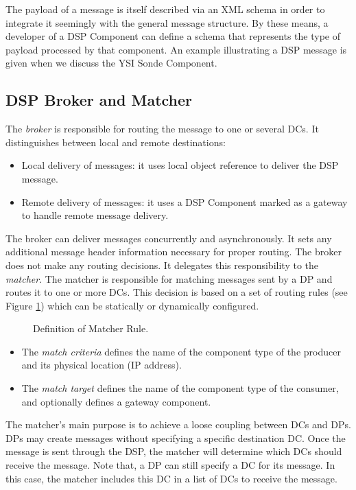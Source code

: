 \documentclass[conference]{IEEEtran}
\begin{document}
The payload of a message is itself described via an XML schema in
order to integrate it seemingly with the general message structure. By these
means, a developer of a DSP Component can define a schema that represents the
type of payload processed by that component. An example illustrating a DSP
message is given when we discuss the YSI Sonde Component.

\subsection{DSP Broker and Matcher}

The \emph{broker} is responsible for routing the message to one or
several DCs. It distinguishes between local and remote destinations:

\begin{itemize}
\item Local delivery of messages: it uses local object reference to
  deliver the DSP message.
\item Remote delivery of messages: it uses a DSP Component marked as a
  gateway to handle remote message delivery.
\end{itemize}

The broker can deliver messages concurrently and asynchronously. It
sets any additional message header information necessary for proper
routing. The broker does not make any routing decisions. It delegates
this responsibility to the \emph{matcher}. The matcher is responsible
for matching messages sent by a DP and routes it to one or more DCs.
This decision is based on a set of routing rules (see Figure
\ref{FIG_MATCHER_RULE}) which can be statically or dynamically
configured.

\begin{figure}[!htb]
 \caption{\label{FIG_MATCHER_RULE} Definition of Matcher Rule.}
\end{figure}

\begin{itemize}
\item The \emph{match criteria} defines the name of the component type
  of the producer and its physical location (IP address).
\item The \emph{match target} defines the name of the component type
  of the consumer, and optionally defines a gateway component.
\end{itemize}

The matcher's main purpose is to achieve a loose coupling between
DCs and DPs. DPs may create messages without specifying a specific
destination DC. Once the message is sent through the DSP, the matcher will
determine which DCs should receive the message. Note that, a DP can
still specify a DC for its message. In this case, the matcher includes
this DC in a list of DCs to receive the message.
\end{document}
